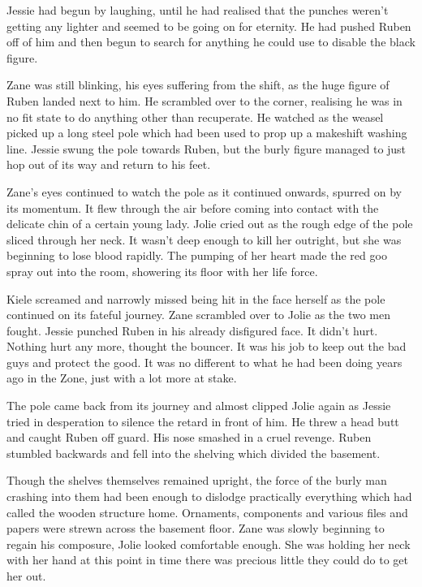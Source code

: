 Jessie had begun by laughing, until he had realised that the punches weren't getting any lighter and seemed to be going on for eternity.  He had pushed Ruben off of him and then begun to search for anything he could use to disable the black figure.

Zane was still blinking, his eyes suffering from the shift, as the huge figure of Ruben landed next to him.  He scrambled over to the corner, realising he was in no fit state to do anything other than recuperate.  He watched as the weasel picked up a long steel pole which had been used to prop up a makeshift washing line.  Jessie swung the pole towards Ruben, but the burly figure managed to just hop out of its way and return to his feet.

Zane's eyes continued to watch the pole as it continued onwards, spurred on by its momentum.  It flew through the air before coming into contact with the delicate chin of a certain young lady.  Jolie cried out as the rough edge of the pole sliced through her neck.  It wasn't deep enough to kill her outright, but she was beginning to lose blood rapidly.  The pumping of her heart made the red goo spray out into the room, showering its floor with her life force.  

Kiele screamed and narrowly missed being hit in the face herself as the pole continued on its fateful journey.  Zane scrambled over to Jolie as the two men fought.  Jessie punched Ruben in his already disfigured face.  It didn't hurt.  Nothing hurt any more, thought the bouncer.  It was his job to keep out the bad guys and protect the good.  It was no different to what he had been doing years ago in the Zone, just with a lot more at stake.

The pole came back from its journey and almost clipped Jolie again as Jessie tried in desperation to silence the retard in front of him.  He threw a head butt and caught Ruben off guard.  His nose smashed in a cruel revenge.  Ruben stumbled backwards and fell into the shelving which divided the basement.  

Though the shelves themselves remained upright, the force of the burly man crashing into them had been enough to dislodge practically everything which had called the wooden structure home.  Ornaments, components and various files and papers were strewn across the basement floor.  Zane was slowly beginning to regain his composure, Jolie looked comfortable enough.  She was holding her neck with her hand at this point in time there was precious little they could do to get her out.  


